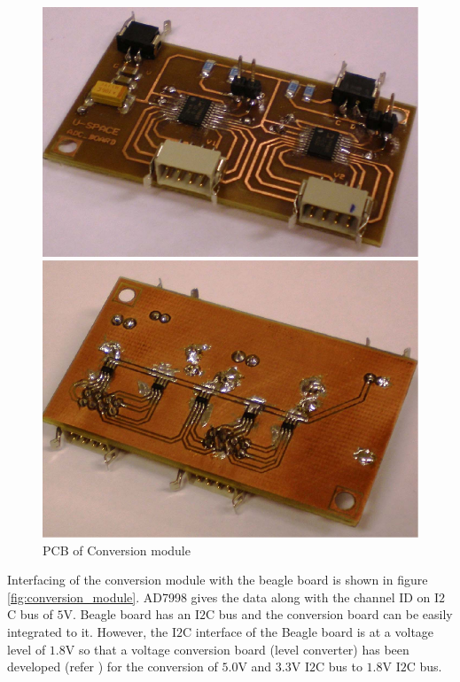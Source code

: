 \begin{figure}[bht]
\centering
\includegraphics[scale=0.45]{figures/PCB_conversion_module.pdf}
\caption{\ac{PCB} of Conversion module}
\label{fig:PCB_conversion_module}
\end{figure}
%
Interfacing of the conversion module with the beagle board is shown in figure \ref{fig:conversion_module}. AD7998 gives the data along with the channel ID on I$2$C bus of $5$V. Beagle board has an I$2$C bus and the conversion board can be easily integrated to it. However, the I$2$C interface of the Beagle board is at a voltage level of $1.8$V so that a voltage conversion board (level converter) has been developed (refer \cite{CDR}) for the conversion of $5.0$V and $3.3$V I$2$C bus to $1.8$V I$2$C bus.
%

